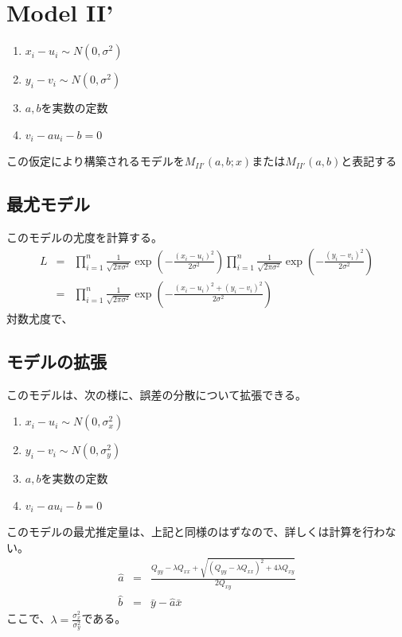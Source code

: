 \section{Model II'}

\begin{enumerate}
 \item $x_i-u_i \sim N(0,\sigma^2)$
 \item $y_i-v_i \sim N(0,\sigma^2)$
 \item $a,b$を実数の定数
 \item $v_i -a u_i -b = 0$
\end{enumerate}
この仮定により構築されるモデルを$M_{II'}(a,b; x)$または$M_{II'}(a,b)$と表記する

\subsection{最尤モデル}
このモデルの尤度を計算する。
\begin{eqnarray*}
 L &=& \prod_{i=1}^{n}\frac{1}{\sqrt{2\pi\sigma^2}}\exp\left(-\frac{(x_i-u_i)^2}{2\sigma^2} \right)\prod_{i=1}^{n}\frac{1}{\sqrt{2\pi\sigma^2}}\exp\left(-\frac{(y_i-v_i)^2}{2\sigma^2} \right)\\
 &=& \prod_{i=1}^{n}\frac{1}{\sqrt{2\pi\sigma^2}}\exp\left(-\frac{(x_i-u_i)^2+(y_i-v_i)^2}{2\sigma^2} \right)
\end{eqnarray*}
対数尤度で、

\subsection{モデルの拡張}
このモデルは、次の様に、誤差の分散について拡張できる。
\begin{enumerate}
 \item $x_i-u_i \sim N(0,\sigma_x^2)$
 \item $y_i-v_i \sim N(0,\sigma_y^2)$
 \item $a,b$を実数の定数
 \item $v_i -a u_i -b = 0$
\end{enumerate}
このモデルの最尤推定量は、上記と同様のはずなので、詳しくは計算を行わない。
\begin{eqnarray*}
 \hat{a} &=& \frac{Q_{yy}-\lambda Q_{xx}+\sqrt{(Q_{yy}-\lambda Q_{xx})^2+4\lambda Q_{xy}}}{2Q_{xy}} \\
 \hat{b} &=& \bar{y}-\hat{a}\bar{x}
\end{eqnarray*}
ここで、$\lambda = \frac{\sigma_x^2}{\sigma_y^2}$である。


\fi




